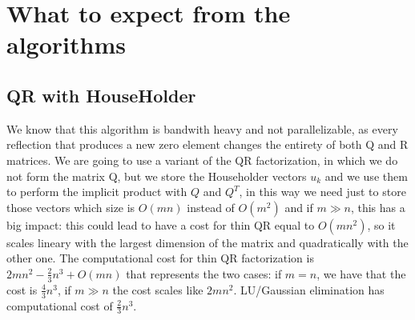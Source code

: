 \documentclass{article}
\begin{document}
\section{What to expect from the algorithms}

\subsection{QR with HouseHolder}
We know that this algorithm is bandwith heavy and not parallelizable, as every reflection that produces a new zero element changes the entirety of both Q and R matrices.
We are going to use a variant of the QR factorization, in which we do not form the matrix Q, but we store the Householder vectors $u_k$ and we use them to perform the implicit product with $Q$ and $Q^T$, in this way we need just to store those vectors which size is $O(mn)$ instead of $O(m^2)$ and if $m \gg n$, this has a big impact: this could lead to have a cost for thin QR equal to $O(mn^2)$, so it scales lineary with the largest dimension of the matrix and quadratically with the other one. The computational cost for thin QR factorization is $2mn^2 - \frac{2}{3}n^3 + O(mn)$ that represents the two cases: if $m = n$, we have that the cost is $\frac{4}{3}n^3$, if $m \gg n$ the cost scales like $2mn^2$. LU/Gaussian elimination has computational cost of $\frac{2}{3}n^3$.
\end{document}
